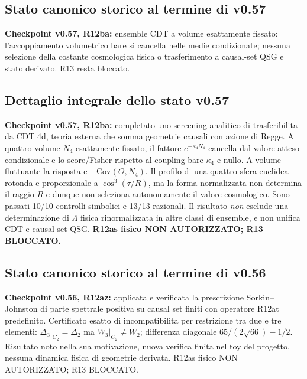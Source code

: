 \documentclass[11pt,a4paper]{article}
\begin{document}
\subsection*{Stato canonico storico al termine di v0.57}
\textbf{Checkpoint v0.57, R12ba:} ensemble CDT a volume esattamente fissato: l'accoppiamento volumetrico bare si cancella nelle medie condizionate; nessuna selezione della costante cosmologica fisica o trasferimento a causal-set QSG e stato derivato. R13 resta bloccato.\par\medskip

\subsection*{Dettaglio integrale dello stato v0.57}
\textbf{Checkpoint v0.57, R12ba:} completato uno screening analitico di trasferibilita da CDT 4d, teoria esterna che somma geometrie causali con azione di Regge. A quattro-volume $N_4$ esattamente fissato, il fattore $e^{-\kappa_4 N_4}$ cancella dal valore atteso condizionale e lo score/Fisher rispetto al coupling bare $\kappa_4$ e nullo. A volume fluttuante la risposta e $-\mathrm{Cov}(O,N_4)$. Il profilo di una quattro-sfera euclidea rotonda e proporzionale a $\cos^3(\tau/R)$, ma la forma normalizzata non determina il raggio $R$ e dunque non seleziona autonomamente il valore cosmologico. Sono passati 10/10 controlli simbolici e 13/13 razionali. Il risultato \emph{non} esclude una determinazione di $\Lambda$ fisica rinormalizzata in altre classi di ensemble, e non unifica CDT e causal-set QSG. \textbf{R12as fisico NON AUTORIZZATO; R13 BLOCCATO.}\par\medskip
\subsection*{Stato canonico storico al termine di v0.56}
\textbf{Checkpoint v0.56, R12az:} applicata e verificata la prescrizione Sorkin--Johnston di parte spettrale positiva su causal set finiti con operatore R12at predefinito. Certificato esatto di incompatibilita per restrizione tra due e tre elementi: $\Delta_3|_{C_2}=\Delta_2$ ma $W_3|_{C_2}\ne W_2$; differenza diagonale $65/(2\sqrt{66})-1/2$. Risultato noto nella sua motivazione, nuova verifica finita nel toy del progetto, nessuna dinamica fisica di geometrie derivata. R12as fisico NON AUTORIZZATO; R13 BLOCCATO.\par\medskip
\end{document}
